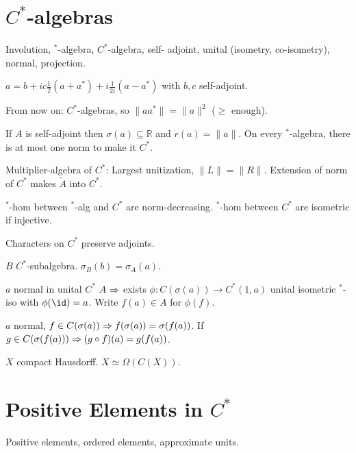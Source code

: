 \documentclass[a4paper, twocolumn, 10pt]{article}
\begin{document}
\section{$C^*$-algebras}

\begin{definition}
    Involution, $^*$-algebra, $C^*$-algebra, self- adjoint, unital (isometry, co-isometry), normal, projection.
\end{definition}

\begin{theorem}
    $a =b + ic \frac{1}{2} (a + a^*) + i \frac{1}{2i} (a - a^*)$ with $b,c$ self-adjoint.
\end{theorem}

From now on: $C^*$-algebras, so $\|a a^*\| = \|a\|^2$ ($\geq$ enough).

\begin{theorem}
    If $A$ is self-adjoint then $\sigma(a) \subseteq \mathds{R}$ and $r(a) = \|a\|$. On every $^*$-algebra, there is at most one norm to make it $C^*$.
\end{theorem}

\begin{theorem}
    Multiplier-algebra of $C^*$: Largest unitization, $\|L\| = \|R\|$.
    Extension of norm of $C^*$ makes $\tilde{A}$ into $C^*$.
\end{theorem}

\begin{theorem}
    $^*$-hom between $^*$-alg and $C^*$ are norm-decreasing. $^*$-hom between $C^*$ are isometric if injective.
\end{theorem}

\begin{theorem}
    Characters on $C^*$ preserve adjoints.
\end{theorem}

\begin{theorem}
    $B$ $C^*$-subalgebra. $\sigma_B(b) = \sigma_A(a)$.
\end{theorem}

\begin{theorem}
    $a$ normal in unital $C^*$ $A$ $\Rightarrow$ exists $\phi: C(\sigma(a)) \to C^*(1,a)$ unital isometric $^*$-iso with $\phi(\id) = a$.
    Write $f(a) \in A$ for $\phi(f)$.
\end{theorem}

\begin{theorem}
    $a$ normal, $f \in C(\sigma(a)) \Rightarrow f(\sigma(a)) = \sigma(f(a))$. If $g \in C(\sigma(f(a))) \Rightarrow (g \circ f)(a) = g(f(a))$.
\end{theorem}

\begin{theorem}
    $X$ compact Hausdorff. $X \simeq \Omega(C(X))$.
\end{theorem}

\section{Positive Elements in $C^*$}

\begin{definition}
    Positive elements, ordered elements, approximate units.
\end{definition}
\end{document}
